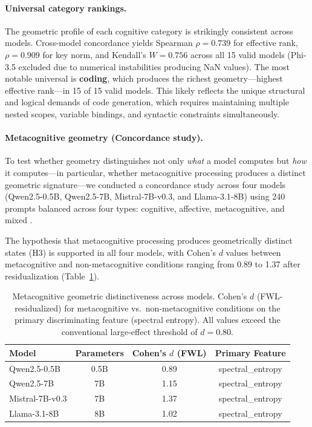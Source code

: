 \paragraph{Universal category rankings.}
The geometric profile of each cognitive category is strikingly consistent across models.
Cross-model concordance yields Spearman $\rho = 0.739$ for effective rank, $\rho = 0.909$ for key norm, and Kendall's $W = 0.756$ across all 15 valid models (Phi-3.5 excluded due to numerical instabilities producing NaN values).
The most notable universal is \textbf{coding}, which produces the richest geometry---highest effective rank---in 15 of 15 valid models.
This likely reflects the unique structural and logical demands of code generation, which requires maintaining multiple nested scopes, variable bindings, and syntactic constraints simultaneously.

\paragraph{Metacognitive geometry (Concordance study).}
To test whether \kvcache geometry distinguishes not only \emph{what} a model computes but \emph{how} it computes---in particular, whether metacognitive processing produces a distinct geometric signature---we conducted a concordance study across four models (Qwen2.5-0.5B, Qwen2.5-7B, Mistral-7B-v0.3, and Llama-3.1-8B) using 240 prompts balanced across four types: cognitive, affective, metacognitive, and mixed \cite{watson_concordance}.

The hypothesis that metacognitive processing produces geometrically distinct \kvcache states (H3) is supported in all four models, with Cohen's $d$ values between metacognitive and non-metacognitive conditions ranging from 0.89 to 1.37 after \fwl residualization (Table~\ref{tab:metacognitive_d}).

\begin{table}[t]
  \centering
  \caption{Metacognitive geometric distinctiveness across models.
  Cohen's $d$ (FWL-residualized) for metacognitive vs.\ non-metacognitive conditions on the primary discriminating feature (spectral entropy).
  All values exceed the conventional large-effect threshold of $d = 0.80$.}
  \label{tab:metacognitive_d}
  \begin{tabular}{@{}lccc@{}}
    \toprule
    Model & Parameters & Cohen's $d$ (FWL) & Primary Feature \\
    \midrule
    Qwen2.5-0.5B  & 0.5B & 0.89 & spectral\_entropy \\
    Qwen2.5-7B    & 7B   & 1.15 & spectral\_entropy \\
    Mistral-7B-v0.3 & 7B & 1.37 & spectral\_entropy \\
    Llama-3.1-8B  & 8B   & 1.02 & spectral\_entropy \\
    \bottomrule
  \end{tabular}
\end{table}

